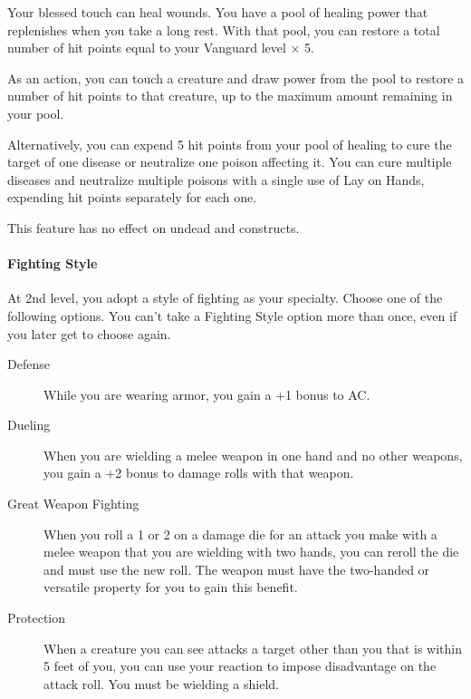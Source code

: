 Your blessed touch can heal wounds. You have a pool of healing power
that replenishes when you take a long rest. With that pool, you can
restore a total number of hit points equal to your Vanguard level × 5.

As an action, you can touch a creature and draw power from the pool to
restore a number of hit points to that creature, up to the maximum
amount remaining in your pool.

Alternatively, you can expend 5 hit points from your pool of healing to
cure the target of one disease or neutralize one poison affecting it.
You can cure multiple diseases and neutralize multiple poisons with a
single use of Lay on Hands, expending hit points separately for each
one.

This feature has no effect on undead and constructs.

\paragraph{Fighting Style}\label{vanguard-feature-fighting-style}

At 2nd level, you adopt a style of fighting as your specialty. Choose
one of the following options. You can't take a Fighting Style option
more than once, even if you later get to choose again.

\begin{description}
\item[Defense]
While you are wearing armor, you gain a +1 bonus to AC.
\end{description}

\begin{description}
\item[Dueling]
When you are wielding a melee weapon in one hand and no other weapons,
you gain a +2 bonus to damage rolls with that weapon.
\end{description}

\begin{description}
\item[Great Weapon Fighting]
When you roll a 1 or 2 on a damage die for an attack you make with a
melee weapon that you are wielding with two hands, you can reroll the
die and must use the new roll. The weapon must have the two-handed or
versatile property for you to gain this benefit.
\end{description}

\begin{description}
\item[Protection]
When a creature you can see attacks a target other than you that is
within 5 feet of you, you can use your reaction to impose disadvantage
on the attack roll. You must be wielding a shield.
\end{description}

